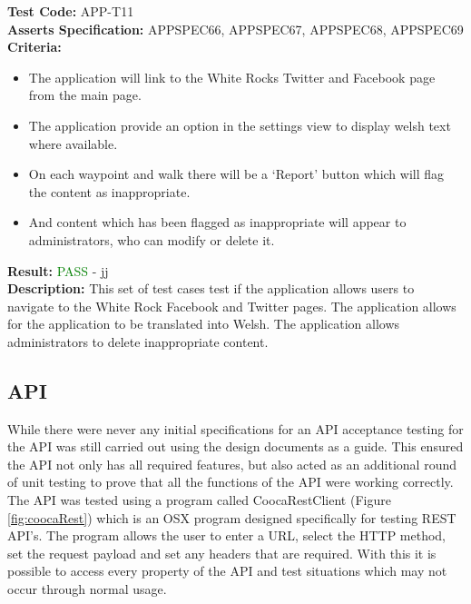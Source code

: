 \documentclass[11pt,a4paper]{report}
\begin{document}
\label{test:APP-T11}
\noindent\textbf{Test Code:} APP-T11\\
\textbf{Asserts Specification:} APPSPEC66, APPSPEC67, APPSPEC68, APPSPEC69\\ 
\textbf{Criteria:} \begin{itemize}
                     \item The application will link to the White Rocks Twitter and Facebook page from the main page.
                     \item The application provide an option in the settings view to display welsh text where available.
                     \item On each waypoint and walk there will be a `Report' button which will flag the content as inappropriate.
                     \item And content which has been flagged as inappropriate will appear to administrators, who can modify or delete it.
                   \end{itemize}
\textbf{Result:} \textcolor{green}{PASS} - jj\\
\textbf{Description:} This set of test cases test if the application allows users to navigate to the White Rock Facebook and Twitter pages. The application allows for the application to be translated into Welsh. The application allows administrators to delete inappropriate content.\\

\subsection{API}

While there were never any initial specifications for an API acceptance testing for the API was still carried out using the design documents as a guide. This ensured the API not only has all required features, but also acted as an additional round of unit testing to prove that all the functions of the API were working correctly. The API was tested using a program called CoocaRestClient (Figure \ref{fig:coocaRest}) which is an OSX program designed specifically for testing REST API's. The program allows the user to enter a URL, select the HTTP method, set the request payload and set any headers that are required. With this it is possible to access every property of the API and test situations which may not occur through normal usage. \\
\end{document}
